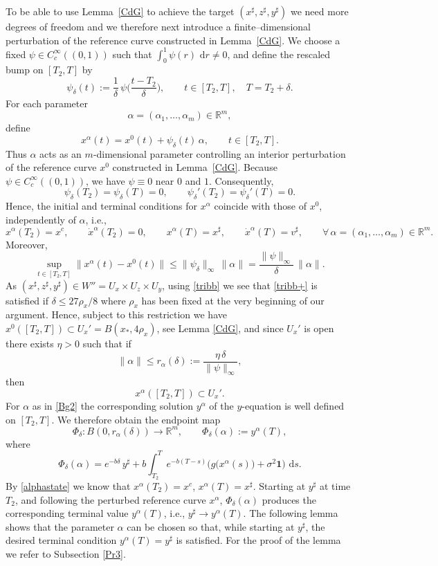 \documentclass[11pt, a4paper,leqno]{amsart}
\theoremstyle{definition}
\numberwithin{equation}{section}
\def \d {{\delta}}
\newcommand{\R}{\mathbb R}
\renewcommand{\d}{\, \mathrm{d}} %
\begin{document}
To be able to use Lemma~\ref{CdG} to achieve the target $(x^\sharp,z^\sharp,y^\sharp)$ we need more degrees of freedom and we therefore next introduce a finite–dimensional perturbation of the reference curve
constructed in Lemma~\ref{CdG}. We choose a fixed $\psi\in C_c^\infty((0,1))$ such that $\int_0^1 \psi(r)\,\d r\neq 0$,
and define the rescaled bump on $[T_2,T]$ by
\[
\psi_\delta(t):=\frac{1}{\delta}\,\psi\!\Big(\frac{t-T_2}{\delta}\Big),
\qquad t\in[T_2,T],\quad T=T_2+\delta.
\]
For each parameter
\[
\alpha=(\alpha_1,\dots,\alpha_m)\in\R^m,
\]
define
\[
x^\alpha(t)=x^0(t)+\psi_\delta(t)\,\alpha,
\qquad t\in[T_2,T].
\]
Thus \(\alpha\) acts as an \(m\)-dimensional parameter controlling an
interior perturbation of the reference curve \(x^0\) constructed in Lemma~\ref{CdG}.
Because \(\psi\in C_c^\infty((0,1))\), we have \(\psi\equiv0\) near \(0\)
and \(1\). Consequently,
\[
\psi_\delta(T_2)=\psi_\delta(T)=0,
\qquad
\psi_\delta'(T_2)=\psi_\delta'(T)=0.
\]
Hence, the initial and terminal conditions for \(x^\alpha\) coincide with those
of \(x^0\), independently of \(\alpha\), i.e.,
\begin{equation}\label{alphastate}
x^\alpha(T_2)=x^c,\qquad
\dot x^\alpha(T_2)=0,
\qquad
x^\alpha(T)=x^\sharp,
\qquad
\dot x^\alpha(T)=v^\sharp,\qquad \forall\, \alpha=(\alpha_1,\dots,\alpha_m)\in\R^m.
\end{equation}
 Moreover,
\[
\sup_{t\in[T_2,T]}\|x^\alpha(t)-x^0(t)\|
\le \|\psi_\delta\|_\infty\,\|\alpha\|
= \frac{\|\psi\|_\infty}{\delta}\,\|\alpha\|.
\]
As $(x^\sharp,z^\sharp,y^\sharp)\in W''=U_x\times U_z\times U_y$, using \eqref{tribb} we see that \eqref{tribb+} is satisfied if $\delta\leq 27\rho_x/8$ where $\rho_x$ has been fixed at the very beginning of our argument. Hence, subject to this restriction we have $x^0([T_2,T])\subset U_x'=B(x_\ast,4\rho_x)$, see Lemma \ref{CdG}, and since $U_x'$ is open there exists $\eta>0$ such that if
\begin{equation}\label{Bg2}
\|\alpha\|\le r_\alpha(\delta)
:=
\frac{\eta\,\delta}{\|\psi\|_\infty},
\end{equation}
then
\[
x^\alpha([T_2,T])\subset U_x' .
\]
For \(\alpha\) as in \eqref{Bg2} the corresponding solution \(y^\alpha\) of the
\(y\)-equation is well defined on \([T_2,T]\).
We therefore obtain the endpoint map
\[
\Phi_\delta:
B(0,r_\alpha(\delta))\to\mathbb R^m,
\qquad
\Phi_\delta(\alpha):=y^\alpha(T),
\]
where
\[
\Phi_\delta(\alpha)
=
e^{-b\delta}\,y^\sharp
+
b\int_{T_2}^{T}
e^{-b(T-s)}
\big(
g\big(x^\alpha(s)\big)
+
\sigma^2\mathbf 1
\big)\,\d s .
\]
By \eqref{alphastate} we know that $x^\alpha(T_2)=x^c$, $x^\alpha(T)=x^\sharp$. Starting  at $y^\sharp$ at time $T_2$, and following the perturbed reference curve $x^\alpha$,  $\Phi_\delta(\alpha)$ produces the corresponding terminal value $y^\alpha(T)$, i.e., $y^\sharp\to y^\alpha(T)$. The following lemma shows that the parameter \(\alpha\) can be chosen so that, while starting at $y^\sharp$, the desired terminal condition \(y^\alpha(T)=y^\sharp\) is satisfied. For the proof of the lemma we refer to Subsection \ref{Pr3}.
\end{document}
